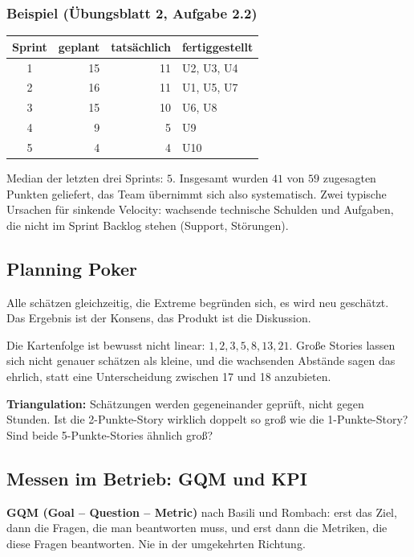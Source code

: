 \documentclass[12pt, a4paper]{article}
\begin{document}
\subsubsection*{Beispiel (Übungsblatt 2, Aufgabe 2.2)}

\begin{center}
\begin{tabular}{crrl}
\hline
\textbf{Sprint} & \textbf{geplant} & \textbf{tatsächlich} & \textbf{fertiggestellt} \\
\hline
1 & 15 & 11 & U2, U3, U4 \\
2 & 16 & 11 & U1, U5, U7 \\
3 & 15 & 10 & U6, U8 \\
4 &  9 &  5 & U9 \\
5 &  4 &  4 & U10 \\
\hline
\end{tabular}
\end{center}

Median der letzten drei Sprints: $5$. Insgesamt wurden $41$ von $59$ zugesagten
Punkten geliefert, das Team übernimmt sich also systematisch. Zwei typische Ursachen
für sinkende Velocity: wachsende technische Schulden und Aufgaben, die nicht im
Sprint Backlog stehen (Support, Störungen).

\subsection{Planning Poker}

Alle schätzen gleichzeitig, die Extreme begründen sich, es wird neu geschätzt. Das
Ergebnis ist der Konsens, das Produkt ist die Diskussion.

Die Kartenfolge ist bewusst nicht linear: $1, 2, 3, 5, 8, 13, 21$. Große Stories
lassen sich nicht genauer schätzen als kleine, und die wachsenden Abstände sagen
das ehrlich, statt eine Unterscheidung zwischen 17 und 18 anzubieten.

\textbf{Triangulation:} Schätzungen werden gegeneinander geprüft, nicht gegen Stunden.
Ist die 2-Punkte-Story wirklich doppelt so groß wie die 1-Punkte-Story? Sind beide
5-Punkte-Stories ähnlich groß?

\subsection{Messen im Betrieb: GQM und KPI}

\begin{definitionbox}
\textbf{GQM (Goal -- Question -- Metric)} nach Basili und Rombach: erst das Ziel, dann
die Fragen, die man beantworten muss, und erst dann die Metriken, die diese Fragen
beantworten. Nie in der umgekehrten Richtung.
\end{definitionbox}
\end{document}
